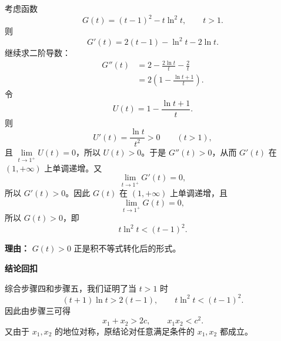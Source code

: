 \begin{proofbox}
\begin{description}[style=nextline, leftmargin=2.8em, labelsep=0.5em, itemsep=0.55em]
		\item[\textbf{步骤五（证明积不等式）：}]
		      考虑函数
		      \[
			      G(t)=(t-1)^2-t\ln^2t,
			      \qquad t>1.
		      \]
		      则
		      \[
			      G'(t)=2(t-1)-\ln^2t-2\ln t.
		      \]
		      继续求二阶导数：
		      \[
			      \begin{aligned}
				      G''(t)
				       & =2-\frac{2\ln t}{t}-\frac{2}{t}     \\
				       & =2\left(1-\frac{\ln t+1}{t}\right).
			      \end{aligned}
		      \]
		      令
		      \[
			      U(t)=1-\frac{\ln t+1}{t}.
		      \]
		      则
		      \[
			      U'(t)=\frac{\ln t}{t^2}>0\qquad(t>1),
		      \]
		      且 $\lim\limits_{t\to1^+}U(t)=0$，所以 $U(t)>0$。于是 $G''(t)>0$，从而 $G'(t)$ 在 $(1,+\infty)$ 上单调递增。又
		      \[
			      \lim_{t\to1^+}G'(t)=0,
		      \]
		      所以 $G'(t)>0$。因此 $G(t)$ 在 $(1,+\infty)$ 上单调递增，且
		      \[
			      \lim_{t\to1^+}G(t)=0,
		      \]
		      所以 $G(t)>0$，即
		      \[
			      t\ln^2t<(t-1)^2.
		      \]
		      \par\textbf{理由：} $G(t)>0$ 正是积不等式转化后的形式。
	\end{description}

	\medskip
	\textbf{\textcolor{CProof}{结论回扣}}

	综合步骤四和步骤五，我们证明了当 $t>1$ 时
	\[
		(t+1)\ln t>2(t-1),
		\qquad
		t\ln^2t<(t-1)^2.
	\]
	因此由步骤三可得
	\[
		x_1+x_2>2c,
		\qquad
		x_1x_2<c^2.
	\]
	又由于 $x_1,x_2$ 的地位对称，原结论对任意满足条件的 $x_1,x_2$ 都成立。
\end{proofbox}